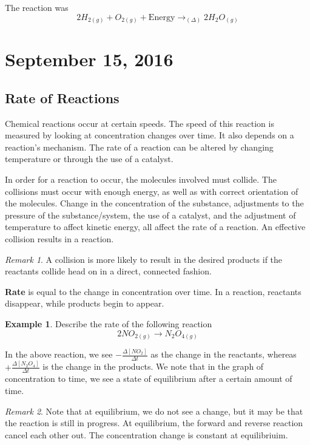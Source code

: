 \documentclass[11pt]{article}
\theoremstyle{plain} %
\theoremstyle{definition}
\theoremstyle{example}
\newtheorem*{example}{Example}
\theoremstyle{remark}
\newtheorem*{remark}{Remark}
\begin{document}
The reaction was $$2H_{2(g)}+O_{2(g)} + \text{Energy} \rightarrow_{(\Delta )} 2H_2O_{(g)}$$



\section{September 15, 2016}
\subsection{Rate of Reactions}

Chemical reactions occur at certain speeds. The speed of this reaction is measured by looking at concentration changes over time. It also depends on a reaction's mechanism. The rate of a reaction can be altered by changing temperature or through the use of a catalyst. 

In order for a reaction to occur, the molecules involved must collide. The collisions must occur with enough energy, as well as with correct orientation of the molecules. Change in the concentration of the substance, adjustments to the pressure of the substance/system, the use of a catalyst, and the adjustment of temperature to affect kinetic energy, all affect the rate of a reaction. An effective collision results in a reaction. 

\begin{remark}
A collision is more likely to result in the desired products if the reactants collide head on in a direct, connected fashion. 
\end{remark}

 \textbf{Rate} is equal to the change in concentration over time. In a reaction, reactants disappear, while products begin to appear. 

\begin{example}
Describe the rate of the following reaction $$2NO_{2(g)} \rightarrow N_2O_{4(g)}$$
\end{example}

In the above reaction, we see $-\frac{\Delta [NO_2]}{\Delta t}$ as the change in the reactants, whereas $+\frac{\Delta [N_2O_4]}{\Delta t}$ is the change in the products. We note that in the graph of concentration to time, we see a state of equilibrium after a certain amount of time. 

\begin{remark}
Note that at equilibrium, we do not see a change, but it may be that the reaction is still in progress. At equilibrium, the forward and reverse reaction cancel each other out. The concentration change is constant at equilibriuim. 
\end{remark}
\end{document}
